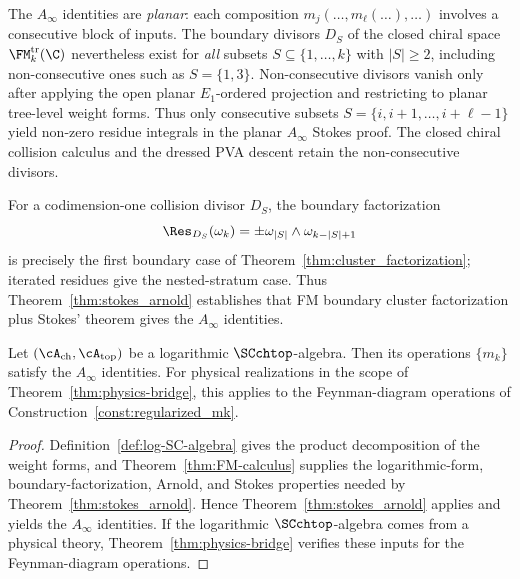 \begin{remark}
\label{rem:nonconsecutive_vanishing}
The $A_\infty$ identities are \emph{planar}: each composition
\(m_j(\ldots,m_\ell(\ldots),\ldots)\) involves a consecutive block of
inputs. The boundary divisors \(D_S\) of the closed chiral space
\(\FM_k^{\mathrm{tr}}(\C)\) nevertheless exist for \emph{all} subsets
\(S\subseteq\{1,\ldots,k\}\) with \(|S|\ge2\), including
non-consecutive ones such as \(S=\{1,3\}\). Non-consecutive divisors
vanish only after applying the open planar \(E_1\)-ordered projection
and restricting to planar tree-level weight forms. Thus only
consecutive subsets \(S=\{i,i+1,\ldots,i+\ell-1\}\) yield non-zero
residue integrals in the planar \(A_\infty\) Stokes proof. The closed
chiral collision calculus and the dressed PVA descent retain the
non-consecutive divisors.
\end{remark}

\begin{remark}
For a codimension-one collision divisor $D_S$, the boundary
factorization
\[
\Res_{D_S}(\omega_k)=\pm\omega_{|S|}\wedge\omega_{k-|S|+1}
\]
is precisely the first boundary case of Theorem~\ref{thm:cluster_factorization};
iterated residues give the nested-stratum case. Thus
Theorem~\ref{thm:stokes_arnold} establishes that FM boundary cluster
factorization plus Stokes' theorem gives the $A_\infty$ identities.
\end{remark}

\begin{corollary}
Let $(\cA_{\mathrm{ch}},\cA_{\mathrm{top}})$ be a logarithmic $\SCchtop$-algebra.
Then its operations $\{m_k\}$ satisfy the $A_\infty$ identities.
For physical realizations in the scope of Theorem~\ref{thm:physics-bridge},
this applies to the Feynman-diagram operations of Construction~\ref{const:regularized_mk}.
\end{corollary}

\begin{proof}
Definition~\ref{def:log-SC-algebra} gives the product decomposition of the
weight forms, and Theorem~\ref{thm:FM-calculus} supplies the logarithmic-form,
boundary-factorization, Arnold, and Stokes properties needed by
Theorem~\ref{thm:stokes_arnold}. Hence Theorem~\ref{thm:stokes_arnold}
applies and yields the $A_\infty$ identities. If the logarithmic
$\SCchtop$-algebra comes from a physical theory, Theorem~\ref{thm:physics-bridge}
verifies these inputs for the Feynman-diagram operations.
\end{proof}

